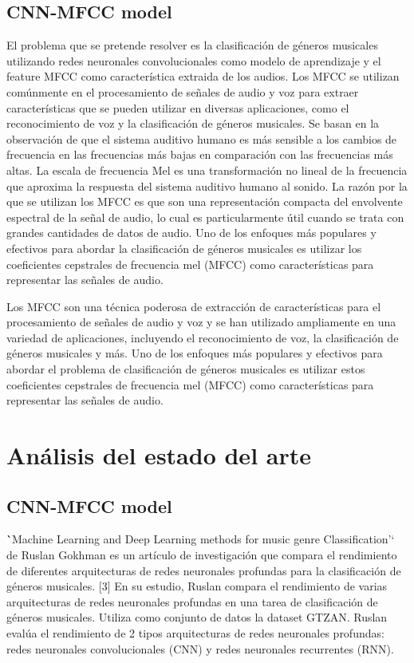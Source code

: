 \documentclass[colorinlistoftodos,twoside,twocolumn,10pt]{article} %
\begin{document}
\subsection {CNN-MFCC model}
    El problema que se pretende resolver es la clasificaci\'on de g\'eneros musicales utilizando redes neuronales convolucionales como modelo de aprendizaje y el feature MFCC como caracter\'istica extraida de los audios.
    Los MFCC se utilizan comúnmente en el procesamiento de señales de audio y voz para extraer características que se pueden utilizar en diversas aplicaciones, como el reconocimiento de voz y la clasificación de géneros musicales. Se basan en la observación de que el sistema auditivo humano es más sensible a los cambios de frecuencia en las frecuencias más bajas en comparación con las frecuencias más altas. La escala de frecuencia Mel es una transformación no lineal de la frecuencia que aproxima la respuesta del sistema auditivo humano al sonido. La razón por la que se utilizan los MFCC es que son una representación compacta del envolvente espectral de la señal de audio, lo cual es particularmente útil cuando se trata con grandes cantidades de datos de audio.
    Uno de los enfoques más populares y efectivos para abordar la clasificación de géneros musicales es utilizar los coeficientes cepstrales de frecuencia mel (MFCC) como características para representar las señales de audio.

    Los MFCC son una técnica poderosa de extracción de características para el procesamiento de señales de audio y voz y se han utilizado ampliamente en una variedad de aplicaciones, incluyendo el reconocimiento de voz, la clasificación de géneros musicales y más.
    Uno de los enfoques más populares y efectivos para abordar el problema de clasificación de géneros musicales es utilizar estos coeficientes cepstrales de frecuencia mel (MFCC) como características para representar las señales de audio.

\section {An\'alisis del estado del arte}
\subsection {CNN-MFCC model}
\``Machine Learning and Deep Learning methods for music genre Classification'`\cite{Machine Learning and Deep Learning methods for music genre Classification} de Ruslan Gokhman es un artículo de investigación que compara el rendimiento de diferentes arquitecturas de redes neuronales profundas para la clasificación de géneros musicales. [3]
En su estudio, Ruslan compara el rendimiento de varias arquitecturas de redes neuronales profundas en una tarea de clasificación de géneros musicales. Utiliza como conjunto de datos la dataset GTZAN. Ruslan eval\'ua el rendimiento de 2 tipos arquitecturas de redes neuronales profundas: redes neuronales convolucionales (CNN) y redes neuronales recurrentes (RNN).
\end{document}
